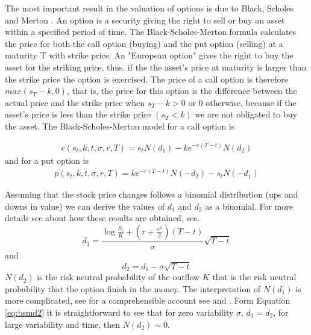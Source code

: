 \documentclass[11pt, onecolumn]{article}
\begin{document}
The most important result in the valuation of options is due to Black, Scholes and Merton \citep{black_pricing_1973}. An option is a security giving the right to sell or buy an asset within a specified period of time. The Black-Scholes-Merton formula calculates the price for both the call option (buying) and the put option (selling) at a maturity T with strike price. An "European option" gives the right to buy the asset for the striking price, thus, if the the asset's price at maturity is larger than the strike price the option is exercised. The price of a call option is therefore $max(s_T - k, 0)$, that is, the price for this option is the difference between the actual price and the strike price when $s_T - k >0$ or 0 otherwise, because if the asset's price is less than the strike price $(s_T < k)$ we are not obligated to buy the asset. 
The Black-Scholes-Merton model for a call option is

\begin{equation}
\begin{split}
 c(s_t,k,t,\sigma,r,T)  = s_t N(d_1) - k e^{-r(T-t)}N(d_2)
 \end{split}
  \label{eq:bsmcall}
\end{equation}
and for a put option is
 \begin{equation}
\begin{split}
 p(s_t,k,t,\sigma,r,T)  = ke^{-r(T-t)}N(-d_2)- s_tN(-d_1)
 \end{split}
  \label{eq:bsmput}
 \end{equation}
 
Assuming that the stock price changes follows a binomial distribution (ups and downs in value) we can derive the values of $d_1$ and $d_2$ as a binomial. For more details see about how these results are obtained, see\citep{hull_options_2011}.
 \begin{equation}
 d_1 =  \frac{\log \frac{S_t}{K} + (r + \frac{\sigma^2}{2})(T-t)  }\sigma \sqrt{T-t}{}
 \label{eq:bsmd1}
 \end{equation}
 and 
 \begin{equation}
 d_2 = d_1 - \sigma \sqrt{T-t}{}
 \label{eq:bsmd2}
 \end{equation}
$N(d_2)$ is the risk neutral probability of the outflow $K$ that is the risk neutral probability that the option finish in the money. %
The interpretation of $N(d_1)$ is more complicated, see \citep{} for a comprehensible account see \citep{hull_options_2005} and \citep{duffie_dynamic_2001}. 
Form Equation \ref{eq:bsmd2} it is straightforward to see that for zero variability $\sigma$, $d_1 = d_2$, for large variability and time, then $N(d_2)\sim 0$.  
\end{document}

